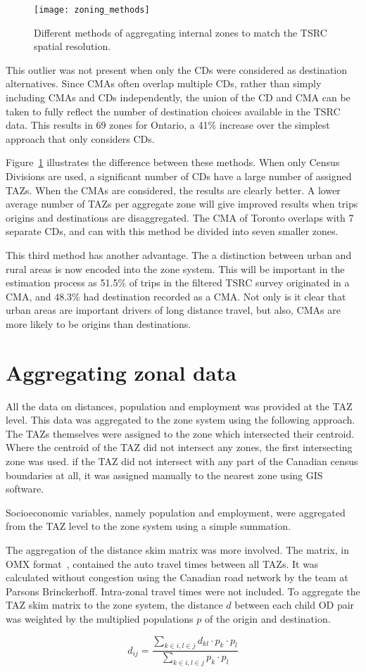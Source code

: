 \begin{figure}[H]
\centering
\texttt{[image: zoning\_methods]}
\caption{Different methods of aggregating internal zones to match the TSRC spatial resolution.}
\label{fig:zoning}
\end{figure}

This outlier was not present when only the CDs were considered as destination alternatives. Since CMAs often overlap multiple CDs, rather than simply including CMAs and CDs independently, the union of the CD and CMA can be taken to fully reflect the number of destination choices available in the TSRC data. This results in 69 zones for Ontario, a 41\% increase over the simplest approach that only considers CDs.

Figure~\ref{fig:zoning} illustrates the difference between these methods. When only Census Divisions are used, a significant number of CDs have a large number of assigned TAZs. When the CMAs are considered, the results are clearly better. A lower average number of TAZs per aggregate zone will give improved results when trips origins and destinations are disaggregated. The CMA of Toronto overlaps with 7 separate CDs, and can with this method be divided into seven smaller zones.

This third method has another advantage. The a distinction between urban and rural areas is now encoded into the zone system. This will be important in the estimation process as 51.5\% of trips in the filtered TSRC survey originated in a CMA, and 48.3\% had destination recorded as a CMA. Not only is it clear that urban areas are important drivers of long distance travel, but also, CMAs are more likely to be origins than destinations.


\section{Aggregating zonal data}
All the data on distances, population and employment was provided at the TAZ level. This data was aggregated to the zone system using the following approach. The TAZs themselves were assigned to the zone which intersected their centroid. Where the centroid of the TAZ did not intersect any zones, the first intersecting zone was used. if the TAZ did not intersect with any part of the Canadian census boundaries at all, it was assigned manually to the nearest zone using GIS software.

Socioeconomic variables, namely population and employment, were aggregated from the TAZ level to the zone system using a simple summation.

The aggregation of the distance skim matrix was more involved. The matrix, in OMX format~\parencite{omx}, contained the auto travel times between all TAZs. It was calculated without congestion using the Canadian road network by the team at Parsons Brinckerhoff. Intra-zonal travel times were not included. To aggregate the TAZ skim matrix to the zone system, the distance $d$ between each child OD pair was weighted by the multiplied populations $p$ of the origin and destination. 

$$ d_{ij} = 
\frac{
\sum_{k \in i, l \in j} d_{kl} \cdot p_k \cdot p_l}
{
\sum_{k \in i, l \in j} p_k \cdot p_l
} 
$$


